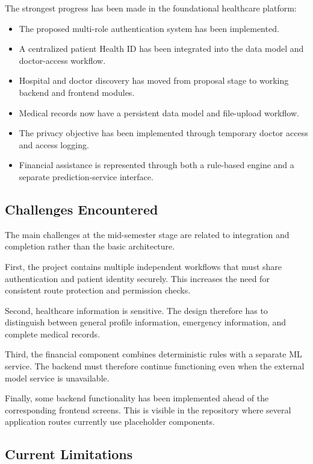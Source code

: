 \documentclass{tietreport}
\begin{document}
The strongest progress has been made in the foundational healthcare
platform:

\begin{itemize}
  \item The proposed multi-role authentication system has been
    implemented.
  \item A centralized patient Health ID has been integrated into the
    data model and doctor-access workflow.
  \item Hospital and doctor discovery has moved from proposal stage to
    working backend and frontend modules.
  \item Medical records now have a persistent data model and file-upload
    workflow.
  \item The privacy objective has been implemented through temporary
    doctor access and access logging.
  \item Financial assistance is represented through both a rule-based
    engine and a separate prediction-service interface.
\end{itemize}

\subsection{Challenges Encountered}

The main challenges at the mid-semester stage are related to integration
and completion rather than the basic architecture.

First, the project contains multiple independent workflows that must
share authentication and patient identity securely. This increases the
need for consistent route protection and permission checks.

Second, healthcare information is sensitive. The design therefore has to
distinguish between general profile information, emergency information,
and complete medical records.

Third, the financial component combines deterministic rules with a
separate ML service. The backend must therefore continue functioning
even when the external model service is unavailable.

Finally, some backend functionality has been implemented ahead of the
corresponding frontend screens. This is visible in the repository where
several application routes currently use placeholder components.

\subsection{Current Limitations}
\end{document}
